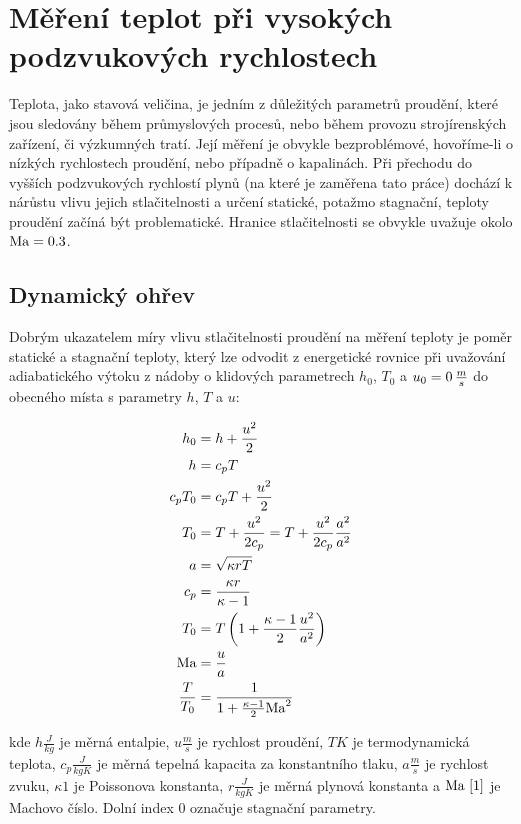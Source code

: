 \section{Měření teplot při vysokých podzvukových rychlostech} \label{sec:mereni-teplot}
    Teplota, jako stavová veličina, je jedním z důležitých parametrů proudění, které jsou sledovány během průmyslových procesů, nebo během provozu strojírenských zařízení, či výzkumných tratí. Její měření je obvykle bezproblémové, hovoříme-li o nízkých rychlostech proudění, nebo případně o kapalinách. Při přechodu do vyšších podzvukových rychlostí plynů (na které je zaměřena tato práce) dochází k nárůstu vlivu jejich stlačitelnosti a určení statické, potažmo stagnační, teploty proudění začíná být problematické. Hranice stlačitelnosti se obvykle uvažuje okolo $\textrm{Ma} = 0.3$.

    \subsection{Dynamický ohřev}

    Dobrým ukazatelem míry vlivu stlačitelnosti proudění na měření teploty je poměr statické a stagnační teploty, který lze odvodit z energetické rovnice při uvažování adiabatického výtoku z nádoby o klidových parametrech $h_0$, $T_0$ a $u_0 = 0 \, \frac{m}{s}$ do obecného místa s parametry $h$, $T$ a $u$:

    \begin{align}
        h_0 &= h + \frac{u^2}{2} \\
        h &= c_p T \\
        c_p T_0 &= c_p T + \frac{u^2}{2} \\
        T_0 &= T + \frac{u^2}{2 c_p} = T + \frac{u^2}{2 c_p} \frac{a^2}{a^2} \label{eq:T0} \\
        a &= \sqrt{\kappa r T} \\
        c_p &= \frac{\kappa r}{\kappa - 1} \\
        T_0 &= T \left( 1 + \frac{\kappa - 1}{2} \frac{u^2}{a^2} \right) \\
        \textrm{Ma} &= \frac{u}{a} \\
        \frac{T}{T_0} &= \frac{1}{1 + \frac{\kappa - 1}{2} \textrm{Ma} ^2}  \label{eq:pomer-T-T0}
    \end{align}

    \noindent kde $h \unit{\frac{J}{kg}}$ je měrná entalpie, $u \unit{\frac{m}{s}}$ je rychlost proudění, $T \unit{K}$ je termodynamická teplota, $c_p \unit{\frac{J}{kg K}}$ je měrná tepelná kapacita za konstantního tlaku, $a \unit{\frac{m}{s}}$ je rychlost zvuku, $\kappa \unit{1}$ je Poissonova konstanta, $r \unit{\frac{J}{kg K}}$ je měrná plynová konstanta a  $\textrm{Ma} \, \left[ 1 \right]$ je Machovo číslo. Dolní index $0$ označuje stagnační parametry.


